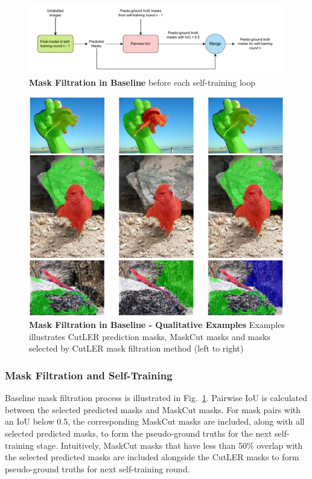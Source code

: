 \begin{figure}
	\centering
	\includegraphics[width=1\textwidth]{Images/main/baseline_mask_filtration.pdf}
	\caption[\textbf{Mask Filtration Method in Baseline}]{\textbf{Mask Filtration in Baseline} before each self-training loop}
	\label{fig:baseline_mask_filtration}
\end{figure}

\begin{figure}
	\centering
	\includegraphics[width=1\textwidth]{Images/main/filtered_mask_problem.png}
	\caption[\textbf{Mask Filtration in Baseline - Qualitative Examples}]{\textbf{Mask Filtration in Baseline - Qualitative Examples} Examples illustrates CutLER prediction masks, MaskCut masks and masks selected by CutLER mask filtration method (left to right)}
	\label{fig:filtered_mask_problem}
\end{figure}

\subsubsection{Mask Filtration and Self-Training}
Baseline mask filtration process is illustrated in Fig.~\ref{fig:baseline_mask_filtration}.  Pairwise IoU is calculated between the selected predicted masks and MaskCut masks. For mask pairs with an IoU below 0.5, the corresponding MaskCut masks are included, along with all selected predicted masks, to form the pseudo-ground truths for the next self-training stage. Intuitively, MaskCut masks that have less than 50\% overlap with the selected predicted masks are included alongside the CutLER masks to form pseudo-ground truths for next self-training round. 

